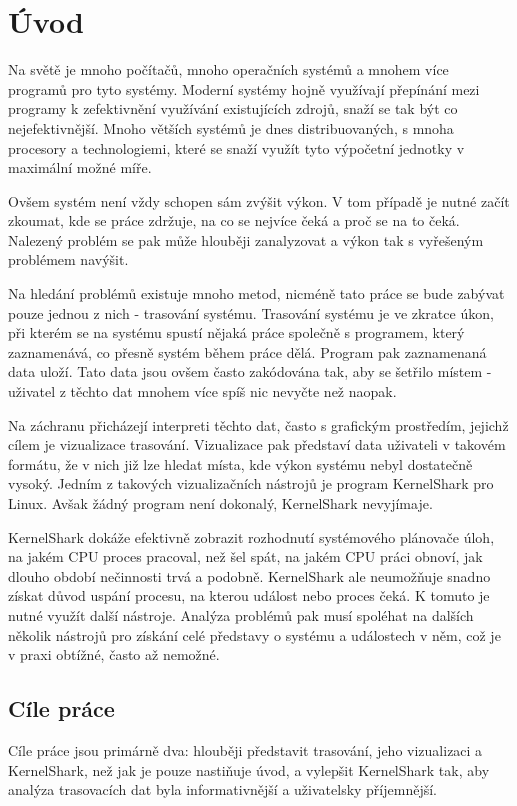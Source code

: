 \chapter*{Úvod}

Na světě je mnoho počítačů, mnoho operačních systémů a mnohem více programů pro tyto systémy. Moderní systémy hojně využívají přepínání mezi programy k zefektivnění využívání existujících zdrojů, snaží se tak být co nejefektivnější. Mnoho větších systémů je dnes distribuovaných, s mnoha procesory a technologiemi, které se snaží využít tyto výpočetní jednotky v maximální možné míře.

Ovšem systém není vždy schopen sám zvýšit výkon. V tom případě je nutné začít zkoumat, kde se práce zdržuje, na co se nejvíce čeká a proč se na to čeká. Nalezený problém se pak může hlouběji zanalyzovat a výkon tak s vyřešeným problémem navýšit.

Na hledání problémů existuje mnoho metod, nicméně tato práce se bude zabývat pouze jednou z nich - trasování systému. Trasování systému je ve zkratce úkon, při kterém se na systému spustí nějaká práce společně s programem, který zaznamenává, co přesně systém během práce dělá. Program pak zaznamenaná data uloží. Tato data jsou ovšem často zakódována tak, aby se šetřilo místem - uživatel z těchto dat mnohem více spíš nic nevyčte než naopak.

Na záchranu přicházejí interpreti těchto dat, často s grafickým prostředím, jejichž cílem je vizualizace trasování. Vizualizace pak představí data uživateli v takovém formátu, že v nich již lze hledat místa, kde výkon systému nebyl dostatečně vysoký. Jedním z takových vizualizačních nástrojů je program KernelShark pro Linux. Avšak žádný program není dokonalý, KernelShark nevyjímaje.

KernelShark dokáže efektivně zobrazit rozhodnutí systémového plánovače úloh, na jakém CPU proces pracoval, než šel spát, na jakém CPU práci obnoví, jak dlouho období nečinnosti trvá a podobně. KernelShark ale neumožňuje snadno získat důvod uspání procesu, na kterou událost nebo proces čeká. K tomuto je nutné využít další nástroje. Analýza problémů pak musí spoléhat na dalších několik nástrojů pro získání celé představy o systému a událostech v něm, což je v praxi obtížné, často až nemožné.

\section*{Cíle práce}
Cíle práce jsou primárně dva: hlouběji představit trasování, jeho vizualizaci a KernelShark, než jak je pouze nastiňuje úvod, a vylepšit KernelShark tak, aby analýza trasovacích dat byla informativnější a uživatelsky příjemnější.

